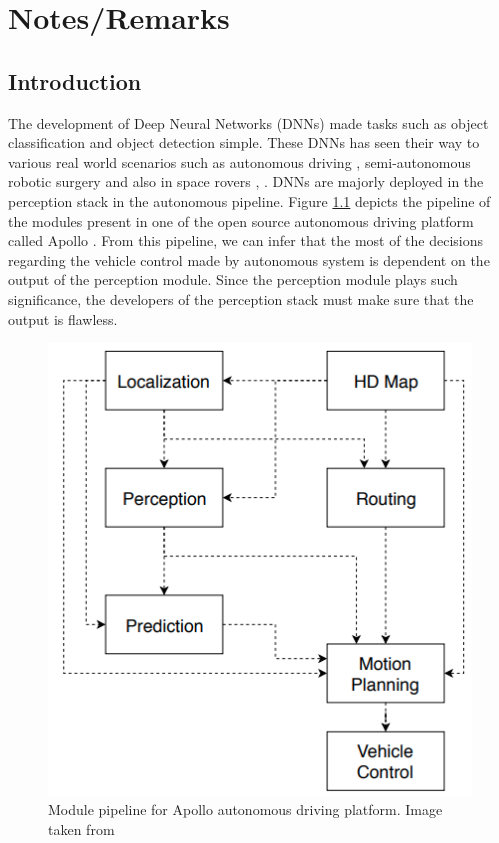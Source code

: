 

\chapter{Notes/Remarks}

\section{Introduction}
The development of Deep Neural Networks (DNNs) made tasks such as object classification and object detection simple.
These DNNs has seen their way to various real world scenarios such as autonomous driving \cite{autonomousdriving}, semi-autonomous robotic surgery \cite{roboticsurgery} and also in space rovers \cite{Marsrover_1}, \cite{Marsrover_2}.
DNNs are majorly deployed in the perception stack in the autonomous pipeline. 
Figure \ref{fig:Apollopipeline} depicts the pipeline of the modules present in one of the open source autonomous driving platform called Apollo \cite{baiduapollo}.
From this pipeline, we can infer that the most of the decisions regarding the vehicle control made by autonomous system is dependent on the output of the perception module.
Since the perception module plays such significance, the developers of the perception stack must make sure that the output is flawless.
\begin{figure}[h!]
    \centering
    \includegraphics[scale=0.35]{images/Apollopipeline.png}
    \caption{Module pipeline for Apollo autonomous driving platform. Image taken from \cite{baiduapollo}}
    \label{fig:Apollopipeline}
\end{figure}

